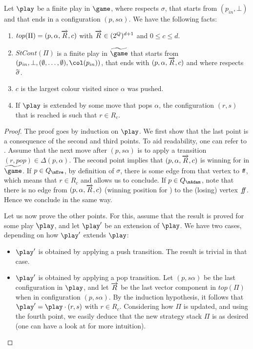 \begin{lemma}\label{11-ini:lemma:games:ReturningSets_paritexp}
Let $\play$ be a finite play in $\game$, where \Eve respects
$\sigma$, that starts from $(p_{\mathit in},\bot)$ and
that ends in a configuration $(p,s\alpha)$. We have the
following facts:

\begin{enumerate}

\item $top(\Pi)=(p,\alpha,\overrightarrow{R},c)$ with
$\overrightarrow{R}\in(2^Q)^{d+1}$ and $0\leq c\leq d$.

\item $StCont(\Pi)$ is a finite play in $\fgame$ that starts
from $(p_{\mathit in},\bot,(\emptyset,\dots,\emptyset),\pdscol{p_{in}})$,
that ends with $(p,\alpha,\overrightarrow{R},c)$ and where
\Eve respects $\widetilde{\sigma}$.

\item $c$ is the largest colour visited since $\alpha$ was pushed.

\item If $\play$ is extended by some move
that pops $\alpha$, the configuration $(r,s)$ that is reached
is such that $r\in R_c$.
\end{enumerate}
\end{lemma}


\begin{proof}
The proof goes by induction on $\play$. We first show that the
last point is a consequence of the second and third points. To aid readability, one can refer to 
. Assume that
the next move after $(p,s\alpha)$ is to apply a transition
$(r,pop)\in\Delta(p,\alpha)$. The second point implies that
$(p,\alpha,\overrightarrow{R},c)$ is winning for \Eve in
$\fgame$. If $p\in Q_\mEve$, by definition of $\sigma$, there is
some edge from that vertex to $t\! t$, which means that
$r\in R_c$ and allows us to conclude. If $p\in Q_\mAdam$, note that there is no
edge from $(p,\alpha,\overrightarrow{R},c)$ (winning position
for \Eve) to the (losing) vertex $f\!\! f$. Hence we
conclude in the same way.

Let us now prove the other points. For this, assume that the
result is proved for some play $\play$, and let $\play'$ be an
extension of $\play$. We have two cases, depending on how $\play'$
extends $\play$:

\begin{itemize}
\item $\play'$ is obtained by applying a push transition. The result is trivial in that case.

\item $\play'$ is obtained by applying a pop transition. Let
$(p,s\alpha)$ be the last configuration in $\play$, and let
$\overrightarrow{R}$ be the last vector component in $top(\Pi)$ when
in configuration $(p,s\alpha)$. By the induction
hypothesis, it follows that $\play'=\play\cdot(r,s)$ with
$r\in R_c$. Considering how $\Pi$ is updated, and
using the fourth point, we easily deduce that the new strategy
stack $\Pi$ is as desired (one can have a look at 
 for more
intuition).
\end{itemize}
\end{proof}

